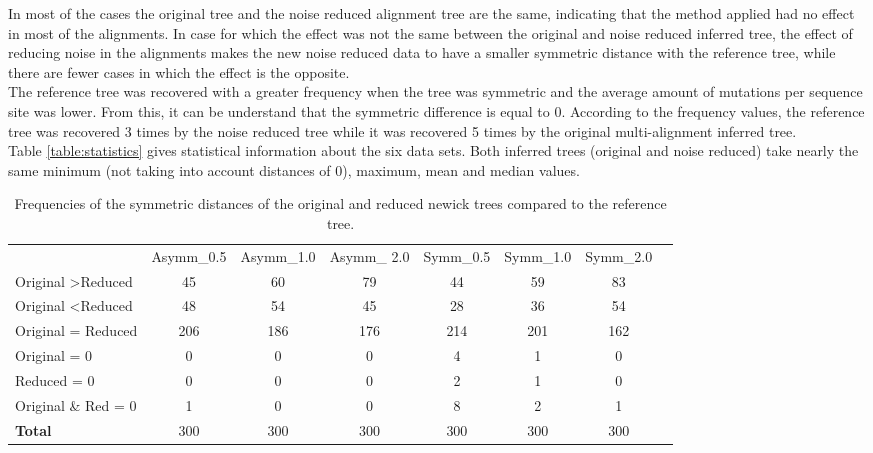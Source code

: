 \documentclass[12pt]{article}
\begin{document}
In most of the cases the original tree and the noise reduced  alignment tree are the same, indicating that the method applied had no effect in most of the alignments. In case for which the effect was not the same between the original and noise reduced inferred tree, the effect of reducing noise in the alignments makes the new noise reduced data to have a smaller symmetric distance with the reference tree, while there are fewer cases in which the effect is the opposite.\\

The reference tree was recovered with a greater frequency when the tree was  symmetric and the average amount of mutations per sequence site was lower. From this, it can be understand that the symmetric difference is equal to 0. According to the frequency values, the reference tree was recovered 3 times by the noise reduced tree  while it was recovered 5 times by the original multi-alignment inferred tree. \\

Table \ref{table:statistics} gives statistical information about the six data sets. Both inferred trees (original and noise reduced) take nearly the same minimum (not taking into account distances of 0), maximum, mean and median values. 


\begin{table}[H]

	\caption{Frequencies of  the symmetric distances of the original and reduced newick trees compared to the reference tree.}
	\begin{adjustwidth}{-2cm}{}
	\small\addtolength{\tabcolsep}{-3pt}
	\begin{tabular}{l|c|c|c|c|c|c|l}
		\cline{2-7}
		\textbf{} & \multicolumn{1}{l|}{Asymm\_0.5} & \multicolumn{1}{l|}{Asymm\_1.0} & \multicolumn{1}{l|}{Asymm\_ 2.0} & \multicolumn{1}{l|}{Symm\_0.5} & \multicolumn{1}{l|}{Symm\_1.0} & \multicolumn{1}{l|}{Symm\_2.0} &  \\ \cline{1-7}
		\multicolumn{1}{|l|}{Original \textgreater Reduced} & 45 & 60 & 79 & 44 & 59 & 83 &  \\ \cline{1-7}
		\multicolumn{1}{|l|}{Original \textless Reduced} & 48 & 54 & 45 & 28 & 36 & 54 &  \\ \cline{1-7}
		\multicolumn{1}{|l|}{Original = Reduced} & 206 & 186 & 176 & 214 & 201 & 162 &  \\ \cline{1-7}
		\multicolumn{1}{|l|}{Original = 0} & 0 & 0 & 0 & 4 & 1 & 0 &  \\ \cline{1-7}
		\multicolumn{1}{|l|}{Reduced = 0} & 0 & 0 & 0 & 2 & 1 & 0 &  \\ \cline{1-7}
		\multicolumn{1}{|l|}{Original \& Red = 0} & 1 & 0 & 0 & 8 & 2 & 1 &  \\ \cline{1-7}
		\multicolumn{1}{|l|}{\textbf{Total}} & 300 & 300 & 300 & 300 & 300 & 300 &  \\ \cline{1-7}
	\end{tabular}
\label{table:freqtable}
 \end{adjustwidth}
\end{table}
\end{document}
